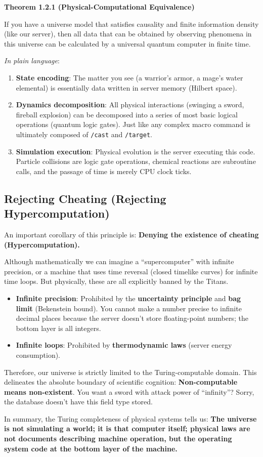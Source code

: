 \textbf{Theorem 1.2.1 (Physical-Computational Equivalence)}

If you have a universe model that satisfies causality and finite information density (like our server), then all data that can be obtained by observing phenomena in this universe can be calculated by a universal quantum computer in finite time.

\textit{In plain language}:

\begin{enumerate}
\item \textbf{State encoding}: The matter you see (a warrior's armor, a mage's water elemental) is essentially data written in server memory (Hilbert space).
\item \textbf{Dynamics decomposition}: All physical interactions (swinging a sword, fireball explosion) can be decomposed into a series of most basic logical operations (quantum logic gates). Just like any complex macro command is ultimately composed of \texttt{/cast} and \texttt{/target}.
\item \textbf{Simulation execution}: Physical evolution is the server executing this code. Particle collisions are logic gate operations, chemical reactions are subroutine calls, and the passage of time is merely CPU clock ticks.
\end{enumerate}

\subsection{Rejecting Cheating (Rejecting Hypercomputation)}

An important corollary of this principle is: \textbf{Denying the existence of cheating (Hypercomputation).}

Although mathematically we can imagine a ``supercomputer'' with infinite precision, or a machine that uses time reversal (closed timelike curves) for infinite time loops. But physically, these are all explicitly banned by the Titans.

\begin{itemize}
\item \textbf{Infinite precision}: Prohibited by the \textbf{uncertainty principle} and \textbf{bag limit} (Bekenstein bound). You cannot make a number precise to infinite decimal places because the server doesn't store floating-point numbers; the bottom layer is all integers.
\item \textbf{Infinite loops}: Prohibited by \textbf{thermodynamic laws} (server energy consumption).
\end{itemize}

Therefore, our universe is strictly limited to the Turing-computable domain. This delineates the absolute boundary of scientific cognition: \textbf{Non-computable means non-existent}. You want a sword with attack power of ``infinity''? Sorry, the database doesn't have this field type stored.

In summary, the Turing completeness of physical systems tells us: \textbf{The universe is not simulating a world; it is that computer itself; physical laws are not documents describing machine operation, but the operating system code at the bottom layer of the machine.}
